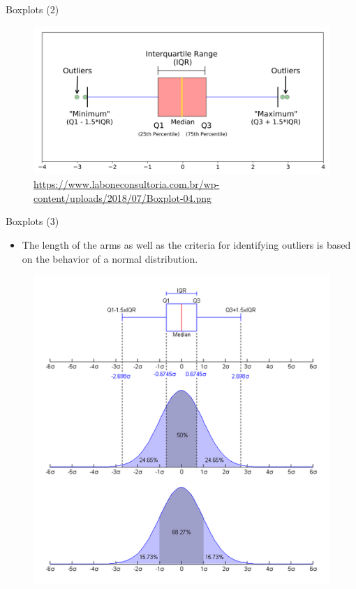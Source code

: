 \documentclass[handout]{beamer}
\begin{document}
\begin{frame}{Boxplots (2)}
\begin{figure}[h!]
	\centering
	\includegraphics[scale=0.1]{pics/boxplot.png}
	\caption{\url{https://www.laboneconsultoria.com.br/wp-content/uploads/2018/07/Boxplot-04.png}}
	
\end{figure} 
\end{frame}


\begin{frame}{Boxplots (3)}
\scriptsize{
\begin{itemize}
 \item The length of the arms as well as the criteria for identifying outliers is based on the behavior of a normal distribution.
\end{itemize}

\begin{figure}[h!]
	\centering
	\includegraphics[scale=0.35]{pics/Boxplot_vs_PDF.png}
	
	
	
\end{figure} 
}
\end{frame}
\end{document}
